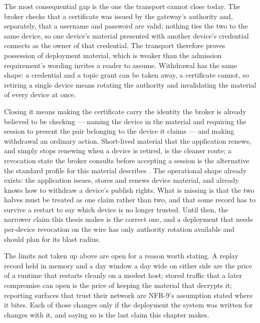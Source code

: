 \documentclass[12pt,a4paper]{report}
\begin{document}
The most consequential gap is the one the transport cannot
close today. The broker checks that a certificate was issued
by the gateway's authority and, separately, that a username
and password are valid; nothing ties the two to the same
device, so one device's material presented with another
device's credential connects as the owner of that credential.
The transport therefore proves possession of deployment
material, which is weaker than the admission requirement's
wording invites a reader to assume. Withdrawal has the same
shape: a credential and a topic grant can be taken away, a
certificate cannot, so retiring a single device means
rotating the authority and invalidating the material of every
device at once.

Closing it means making the certificate carry the identity
the broker is already believed to be checking --- naming the
device in the material and requiring the session to present
the pair belonging to the device it claims --- and making
withdrawal an ordinary action. Short-lived material that the
application renews, and simply stops renewing when a device
is retired, is the cleaner route; a revocation state the
broker consults before accepting a session is the alternative
the standard profile for this material describes
\cite{x509}. The operational shape already exists: the
application issues, stores and renews device material, and
already knows how to withdraw a device's publish rights. What
is missing is that the two halves must be treated as one
claim rather than two, and that some record has to survive a
restart to say which device is no longer trusted. Until then,
the narrower claim this thesis makes is the correct one, and a
deployment that needs per-device revocation on the wire has
only authority rotation available and should plan for its
blast radius.

The limits not taken up above are open for a reason worth
stating. A replay record held in memory and a day window a
day wide on either side are the price of a runtime that
restarts cleanly on a modest host; stored traffic that a
later compromise can open is the price of keeping the
material that decrypts it; reporting surfaces that trust
their network are NFR-9's assumption stated where it bites.
Each of those changes only if the deployment the system was
written for changes with it, and saying so is the last claim
this chapter makes.
\end{document}
